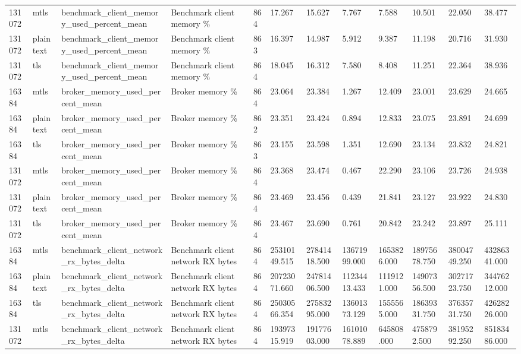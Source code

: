 \begin{longtable}{llllllllllll}
131072 & mtls & benchmark\_client\_memory\_used\_percent\_mean & Benchmark client memory \% & 864 & 17.267 & 15.627 & 7.767 & 7.588 & 10.501 & 22.050 & 38.477 \\
131072 & plaintext & benchmark\_client\_memory\_used\_percent\_mean & Benchmark client memory \% & 863 & 16.397 & 14.987 & 5.912 & 9.387 & 11.198 & 20.716 & 31.930 \\
131072 & tls & benchmark\_client\_memory\_used\_percent\_mean & Benchmark client memory \% & 864 & 18.045 & 16.312 & 7.580 & 8.408 & 11.251 & 22.364 & 38.936 \\
16384 & mtls & broker\_memory\_used\_percent\_mean & Broker memory \% & 864 & 23.064 & 23.384 & 1.267 & 12.409 & 23.001 & 23.629 & 24.665 \\
16384 & plaintext & broker\_memory\_used\_percent\_mean & Broker memory \% & 862 & 23.351 & 23.424 & 0.894 & 12.833 & 23.075 & 23.891 & 24.699 \\
16384 & tls & broker\_memory\_used\_percent\_mean & Broker memory \% & 863 & 23.155 & 23.598 & 1.351 & 12.690 & 23.134 & 23.832 & 24.821 \\
131072 & mtls & broker\_memory\_used\_percent\_mean & Broker memory \% & 864 & 23.368 & 23.474 & 0.467 & 22.290 & 23.106 & 23.726 & 24.938 \\
131072 & plaintext & broker\_memory\_used\_percent\_mean & Broker memory \% & 864 & 23.469 & 23.456 & 0.439 & 21.841 & 23.127 & 23.922 & 24.830 \\
131072 & tls & broker\_memory\_used\_percent\_mean & Broker memory \% & 864 & 23.467 & 23.690 & 0.761 & 20.842 & 23.242 & 23.897 & 25.111 \\
16384 & mtls & benchmark\_client\_network\_rx\_bytes\_delta & Benchmark client network RX bytes & 864 & 25310149.515 & 27841418.500 & 13671999.000 & 1653826.000 & 18975678.750 & 38004749.250 & 43286341.000 \\
16384 & plaintext & benchmark\_client\_network\_rx\_bytes\_delta & Benchmark client network RX bytes & 864 & 20723071.660 & 24781406.500 & 11234413.433 & 1119121.000 & 14907356.500 & 30271723.750 & 34476212.000 \\
16384 & tls & benchmark\_client\_network\_rx\_bytes\_delta & Benchmark client network RX bytes & 864 & 25030566.354 & 27583295.000 & 13601373.129 & 1555565.000 & 18639331.750 & 37635731.750 & 42628226.000 \\
131072 & mtls & benchmark\_client\_network\_rx\_bytes\_delta & Benchmark client network RX bytes & 864 & 19397315.919 & 19177603.000 & 16101078.889 & 645808.000 & 4758792.500 & 38195292.250 & 85183486.000 \\

\end{longtable}
